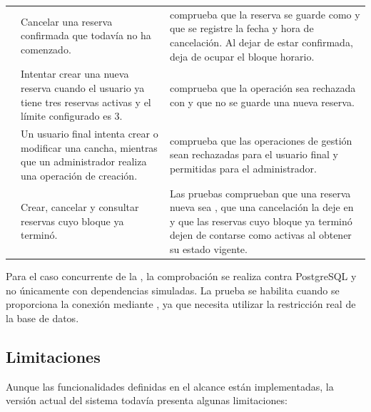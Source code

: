 \begin{xltabular}{\textwidth}{C{1.6cm} Y Y}
     &
    Cancelar una reserva confirmada que todavía no ha comenzado. &
     comprueba que la reserva se guarde como
     y que se registre la fecha y hora de cancelación. Al dejar
    de estar confirmada, deja de ocupar el bloque horario. \\

     &
    Intentar crear una nueva reserva cuando el usuario ya tiene tres reservas
    activas y el límite configurado es 3. &
     comprueba que la operación sea rechazada
    con  y que no se guarde una nueva
    reserva. \\

     &
    Un usuario final intenta crear o modificar una cancha, mientras que un
    administrador realiza una operación de creación. &
     comprueba que las operaciones de gestión sean
    rechazadas para el usuario final y permitidas para el administrador. \\

     &
    Crear, cancelar y consultar reservas cuyo bloque ya terminó. &
    Las pruebas comprueban que una reserva nueva sea , que una
    cancelación la deje en  y que las reservas cuyo bloque ya
    terminó dejen de contarse como activas al obtener su estado vigente. \\

\end{xltabular}
\normalsize

Para el caso concurrente de la , la comprobación se realiza contra
PostgreSQL y no únicamente con dependencias simuladas. La prueba
 se habilita cuando se proporciona la conexión
mediante , ya que necesita utilizar la restricción
real de la base de datos.

\subsection{Limitaciones}
\label{sec:limitaciones}

Aunque las funcionalidades definidas en el alcance están implementadas, la
versión actual del sistema todavía presenta algunas limitaciones:

